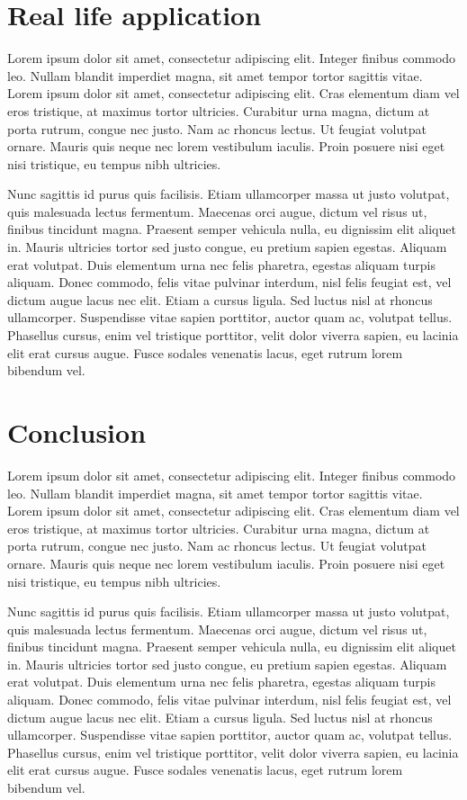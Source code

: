 \documentclass[
  digital,     %
  oneside,     %
  nosansbold,  %
  nocolorbold, %
  lof,         %
  lot,         %
]{fithesis4}
\begin{document}
\chapter{Real life application}
\shorthandoff{-}
Lorem ipsum dolor sit amet, consectetur adipiscing elit. Integer finibus commodo leo. Nullam blandit imperdiet magna, sit amet tempor tortor sagittis vitae. Lorem ipsum dolor sit amet, consectetur adipiscing elit. Cras elementum diam vel eros tristique, at maximus tortor ultricies. Curabitur urna magna, dictum at porta rutrum, congue nec justo. Nam ac rhoncus lectus. Ut feugiat volutpat ornare. Mauris quis neque nec lorem vestibulum iaculis. Proin posuere nisi eget nisi tristique, eu tempus nibh ultricies.

Nunc sagittis id purus quis facilisis. Etiam ullamcorper massa ut justo volutpat, quis malesuada lectus fermentum. Maecenas orci augue, dictum vel risus ut, finibus tincidunt magna. Praesent semper vehicula nulla, eu dignissim elit aliquet in. Mauris ultricies tortor sed justo congue, eu pretium sapien egestas. Aliquam erat volutpat. Duis elementum urna nec felis pharetra, egestas aliquam turpis aliquam. Donec commodo, felis vitae pulvinar interdum, nisl felis feugiat est, vel dictum augue lacus nec elit. Etiam a cursus ligula. Sed luctus nisl at rhoncus ullamcorper. Suspendisse vitae sapien porttitor, auctor quam ac, volutpat tellus. Phasellus cursus, enim vel tristique porttitor, velit dolor viverra sapien, eu lacinia elit erat cursus augue. Fusce sodales venenatis lacus, eget rutrum lorem bibendum vel.
\shorthandon{-}

\chapter*{Conclusion }
\shorthandoff{-}
Lorem ipsum dolor sit amet, consectetur adipiscing elit. Integer finibus commodo leo. Nullam blandit imperdiet magna, sit amet tempor tortor sagittis vitae. Lorem ipsum dolor sit amet, consectetur adipiscing elit. Cras elementum diam vel eros tristique, at maximus tortor ultricies. Curabitur urna magna, dictum at porta rutrum, congue nec justo. Nam ac rhoncus lectus. Ut feugiat volutpat ornare. Mauris quis neque nec lorem vestibulum iaculis. Proin posuere nisi eget nisi tristique, eu tempus nibh ultricies.

Nunc sagittis id purus quis facilisis. Etiam ullamcorper massa ut justo volutpat, quis malesuada lectus fermentum. Maecenas orci augue, dictum vel risus ut, finibus tincidunt magna. Praesent semper vehicula nulla, eu dignissim elit aliquet in. Mauris ultricies tortor sed justo congue, eu pretium sapien egestas. Aliquam erat volutpat. Duis elementum urna nec felis pharetra, egestas aliquam turpis aliquam. Donec commodo, felis vitae pulvinar interdum, nisl felis feugiat est, vel dictum augue lacus nec elit. Etiam a cursus ligula. Sed luctus nisl at rhoncus ullamcorper. Suspendisse vitae sapien porttitor, auctor quam ac, volutpat tellus. Phasellus cursus, enim vel tristique porttitor, velit dolor viverra sapien, eu lacinia elit erat cursus augue. Fusce sodales venenatis lacus, eget rutrum lorem bibendum vel.
\shorthandon{-}
\end{document}
